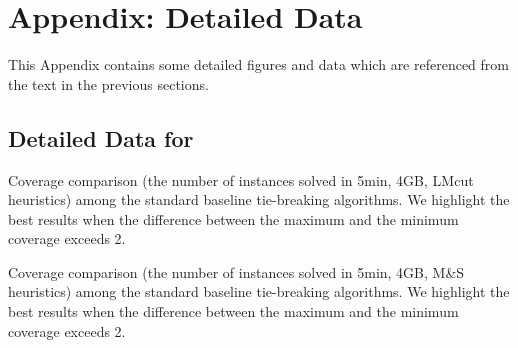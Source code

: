 \chapter{Appendix: Detailed Data}
\label{sec:appendix}

This Appendix contains some detailed figures and data which are referenced from the text in the previous sections. 


\clearpage

\section{Detailed Data for }

\linespread{0.7}
\selectfont

\begin{table}[htb]
 {
 \centering
 \setlength{\tabcolsep}{0.2em}
 
 \caption{
 Coverage comparison (the number of instances solved in 5min, 4GB, LMcut
 heuristics) among
 the standard baseline tie-breaking algorithms. We highlight the
 best results when the difference between the maximum and the minimum coverage exceeds 2.
 }
 \label{tbl:lmcut-ipc-std}
 }
\end{table}

\begin{table}[htb]
 {
 \centering
 \setlength{\tabcolsep}{0.2em}
 
 \caption{
 Coverage comparison (the number of instances solved in 5min, 4GB, M\&S heuristics) among
 the standard baseline tie-breaking algorithms. We highlight the
 best results when the difference between the maximum and the minimum coverage exceeds 2.
 }
 \label{tbl:mands-ipc-std}
 }
\end{table}

%
% 
%  

